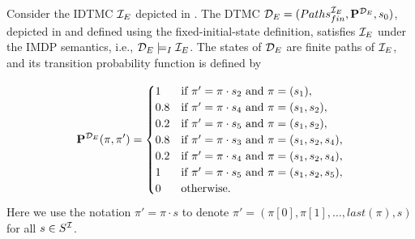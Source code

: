 

    

\begin{example}\label{ex:IMDP-semantic}
    Consider the IDTMC $\mathcal{I}_E$ depicted in . The DTMC $\mathcal{D}_E = (Paths_{fin}^{\mathcal{I}_E},\mathbf{P}^{\mathcal{D}_{E}},s_{0})$, depicted in  and defined using the fixed-initial-state definition, satisfies $\mathcal{I}_E$ under the IMDP semantics, i.e., $\mathcal{D}_E \models_I \mathcal{I}_E$. The states of $\mathcal{D}_E$ are finite paths of $\mathcal{I}_E$, and its transition probability function is defined by

    \[\mathbf{P}^{\mathcal{D}_E}(\pi,\pi') = \begin{cases}
    1 & \text{if } \pi'=\pi\cdot s_2 \text{ and } \pi=(s_1),\\
    0.8 & \text{if } \pi'=\pi\cdot s_4 \text{ and } \pi=(s_1,s_2),\\
    0.2 & \text{if } \pi'=\pi\cdot s_5 \text{ and } \pi=(s_1,s_2),\\
    0.8 & \text{if } \pi'=\pi\cdot s_3 \text{ and } \pi=(s_1,s_2,s_4),\\
    0.2 & \text{if } \pi'=\pi\cdot s_4 \text{ and } \pi=(s_1,s_2,s_4),\\
    1 & \text{if } \pi'=\pi\cdot s_5 \text{ and } \pi=(s_1,s_2,s_5),\\
    0 & \text{otherwise}.
    \end{cases}
    \]
    Here we use the notation $\pi' = \pi \cdot s$ to denote $\pi' = (\pi[0],\pi[1],\dots,last(\pi),s)$ for all $s\in S^{\mathcal{I}}$.
\end{example}

